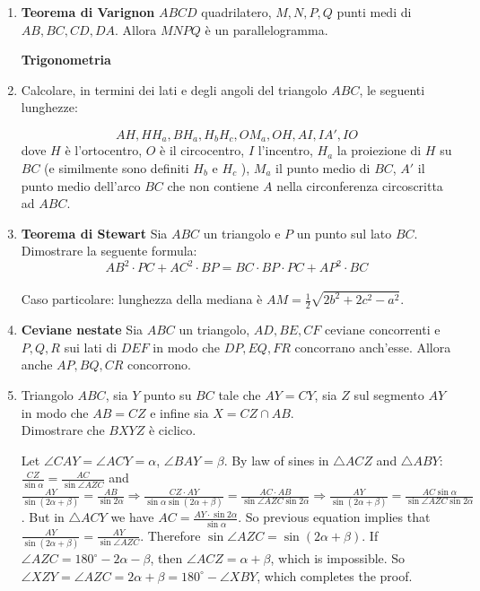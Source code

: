 \begin{enumerate}
\item \textbf{Teorema di Varignon} $ABCD$ quadrilatero, $M,N,P,Q$ punti medi di $AB,BC,CD,DA$. Allora $MNPQ$ è un parallelogramma.



\textbf{Trigonometria}

\item  Calcolare, in termini dei lati e degli angoli del triangolo $ABC$, le seguenti lunghezze: 

$$AH, HH_a , BH_a , H_bH_c , OM_a , OH, AI, IA' , IO$$
dove $H$ è l’ortocentro, $O$ è il circocentro, $I$ l’incentro, $H_a$ la proiezione di $H$ su $BC$ (e similmente
sono definiti $H_b$ e $H_c$ ), $M_a$ il punto medio di $BC$, $A'$ il punto medio dell’arco $BC$ che non contiene
$A$ nella circonferenza circoscritta ad $ABC$.

\item \textbf{Teorema di Stewart} Sia $ABC$ un triangolo e $P$ un punto sul lato $BC$. Dimostrare la seguente formula: 
$$AB^2\cdot PC + AC^2 \cdot BP = BC \cdot BP \cdot PC + AP^2 \cdot BC$$\\
Caso particolare: lunghezza della mediana è $AM=\frac{1}{2}\sqrt{2b^2+2c^2-a^2}$.

\item \textbf{Ceviane nestate} Sia $ABC$ un triangolo, $AD,BE,CF$ ceviane concorrenti e $P,Q,R$ sui lati di $DEF$ in modo che $DP,EQ,FR$ concorrano anch'esse. Allora anche $AP,BQ,CR$ concorrono.

\item  Triangolo $ABC$, sia $Y$ punto su $BC$ tale che $AY=CY$, sia $Z$ sul segmento $AY$ in modo che $AB=CZ$ e infine sia $X=CZ\cap AB$.\\
Dimostrare che $BXYZ$ è ciclico.\\
\begin{sol}
 Let $\angle CAY = \angle ACY = \alpha$, $\angle BAY = \beta$.
By law of sines in $\triangle ACZ$ and $\triangle ABY$:
$\frac{CZ}{\sin \alpha} = \frac{AC}{\sin \angle AZC}$ and $\frac{AY}{\sin(2\alpha+\beta)} = \frac{AB}{\sin 2\alpha} \Rightarrow \frac{CZ \cdot AY}{\sin \alpha \sin (2\alpha + \beta)} = \frac{AC \cdot AB}{\sin \angle AZC \sin 2\alpha} \Rightarrow \frac{AY}{\sin (2\alpha + \beta)}=\frac{AC \sin \alpha}{\sin \angle AZC \sin 2\alpha}$.
But in $\triangle ACY$ we have $AC = \frac{AY \cdot \sin 2\alpha}{\sin \alpha}$. So previous equation implies that $\frac{AY}{\sin(2\alpha + \beta)} = \frac{AY}{\sin \angle AZC}$.
Therefore $\sin \angle AZC = \sin(2\alpha + \beta)$. If $\angle AZC = 180^{\circ}-2\alpha-\beta$, then $\angle ACZ = \alpha + \beta$, which is impossible. So $\angle XZY = \angle AZC = 2\alpha + \beta = 180^{\circ}-\angle XBY$, which completes the proof.
\end{sol}


\end{enumerate}
